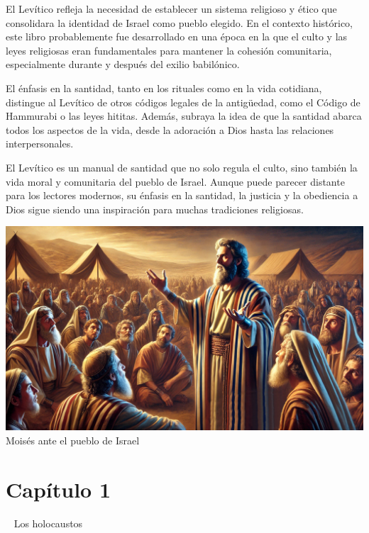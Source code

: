 El Levítico refleja la necesidad de establecer un sistema religioso y ético que consolidara la identidad de Israel como pueblo elegido. En el contexto histórico, este libro probablemente fue desarrollado en una época en la que el culto y las leyes religiosas eran fundamentales para mantener la cohesión comunitaria, especialmente durante y después del exilio babilónico.

El énfasis en la santidad, tanto en los rituales como en la vida cotidiana, distingue al Levítico de otros códigos legales de la antigüedad, como el Código de Hammurabi o las leyes hititas. Además, subraya la idea de que la santidad abarca todos los aspectos de la vida, desde la adoración a Dios hasta las relaciones interpersonales.



El Levítico es un manual de santidad que no solo regula el culto, sino también la vida moral y comunitaria del pueblo de Israel. Aunque puede parecer distante para los lectores modernos, su énfasis en la santidad, la justicia y la obediencia a Dios sigue siendo una inspiración para muchas tradiciones religiosas.\\

\begin{center}
		\includegraphics[width=0.7\linewidth]{graficas/levitico}\\
	Moisés ante el pueblo de Israel \\
\end{center}




\section*{Capítulo 1} 
Los holocaustos 

